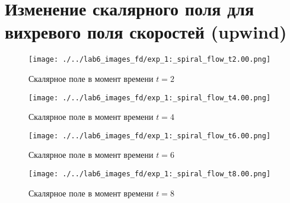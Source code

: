 \chapter{Изменение скалярного поля  для вихревого поля скоростей (upwind)}
\label{app:vortex_df}

\begin{figure}[h]
	\centering
	\texttt{[image: ./../lab6\_images\_fd/exp\_1:\_spiral\_flow\_t2.00.png]}
	\caption{Скалярное поле в момент времени $t=2$ }
\end{figure}
\begin{figure}[h]
	\centering
	\texttt{[image: ./../lab6\_images\_fd/exp\_1:\_spiral\_flow\_t4.00.png]}
	\caption{Скалярное поле в момент времени $t=4$ }
\end{figure}
\begin{figure}[h]
	\centering
	\texttt{[image: ./../lab6\_images\_fd/exp\_1:\_spiral\_flow\_t6.00.png]}
	\caption{Скалярное поле в момент времени $t=6$ }
\end{figure}
\begin{figure}[h]
	\centering
	\texttt{[image: ./../lab6\_images\_fd/exp\_1:\_spiral\_flow\_t8.00.png]}
	\caption{Скалярное поле в момент времени $t=8$ }
\end{figure}